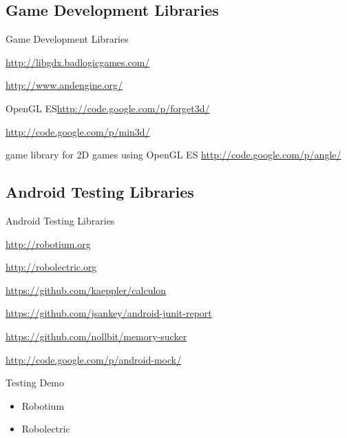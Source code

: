 \documentclass[aspectratio=169]{beamer}
\newcommand{\surl}[1] {{\tiny \url{#1}}}
\begin{document}
\subsection{Game Development Libraries}

    \begin{frame}{Game Development Libraries}
      \begin{description}
       \item<1->[libgdx] \surl{http://libgdx.badlogicgames.com/}
        \item<2->[AndEngine] \surl{http://www.andengine.org/}
        
       \item<3->[forget3D] OpenGL ES\surl{http://code.google.com/p/forget3d/}
        \item<4->[min3d] \surl{http://code.google.com/p/min3d/}
        \item<5->[Angle] game library for 2D games using OpenGL ES \surl{http://code.google.com/p/angle/}
      \end{description}
    \end{frame}

  \subsection{Android Testing Libraries}

    \begin{frame}{Android Testing Libraries}
      \begin{description}
        \item<1->[Robotium] \surl{http://robotium.org}
        \item<2->[Robolectric] \surl{http://robolectric.org}
        \item<3->[Calculon] \surl{https://github.com/kaeppler/calculon}
        \item<4->[Android JUnit Report] \surl{https://github.com/jsankey/android-junit-report}
        \item<5->[Memory Sucker] \surl{https://github.com/nollbit/memory-sucker}
        \item<6->[Android Mock] \surl{http://code.google.com/p/android-mock/}
      \end{description}
    \end{frame}

    \begin{frame}{Testing Demo}
      \begin{itemize}
       \item Robotium
       \item Robolectric
      \end{itemize}
    \end{frame}
\end{document}
